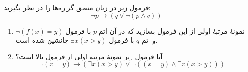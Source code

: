 فرمول زیر در زبان منطق گزاره‌ها را در نظر بگیرید:
\[\neg p \rightarrow (q \vee \neg(p \wedge q))\]
\begin{enumerate}
  \item نمونه‌ٔ مرتبهٔ اولی از این فرمول بسازید که در آن اتم $p$ با فرمول $\neg(f(x)=y)$ و اتم $q$ با فرمول $\exists x (x > y)$ جانشین شده است.
  \item آیا فرمول زیر نمونهٔ مرتبهٔ اولی از فرمول بالا است؟
  \[ \neg(x = y) \rightarrow (\exists x (x > y) \vee \neg((x = y) \wedge \exists x (x > y))) \]
\end{enumerate}